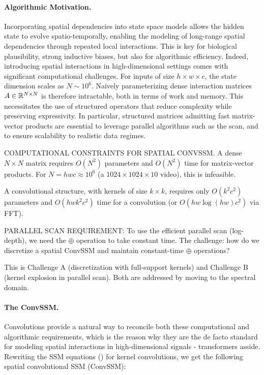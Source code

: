 \documentclass{article}
\begin{document}
\paragraph{Algorithmic Motivation.} 
Incorporating spatial dependencies into state space models allows the hidden state to evolve spatio-temporally, enabling the modeling of long-range spatial dependencies through repeated local interactions. This is key for biological plausibility, strong inductive biases, but also for algorithmic efficiency.
%
Indeed, introducing spatial interactions in high-dimensional settings comes with significant computational challenges. For inputs of size $h \!\times\! w \!\times\! c$, the state dimension scales as $N \sim 10^6$. Naively parameterizing dense interaction matrices $A \in \mathbb{R}^{N \times N}$ is therefore intractable, both in terms of work and memory.
%
This necessitates the use of structured operators that reduce complexity while preserving expressivity. In particular, structured matrices admitting fast matrix-vector products are essential to leverage parallel algorithms such as the scan, and to ensure scalability to realistic data regimes.

\begin{thomasbox}
COMPUTATIONAL CONSTRAINTS FOR SPATIAL CONVSSM. A dense $N \times N$ matrix requires $O(N^2)$ parameters and $O(N^2)$ time for matrix-vector products. For $N = hwc \approx 10^6$ (a $1024 \times 1024 \times 10$ video), this is infeasible.

A convolutional structure, with kernels of size $k \times k$, requires only $O(k^2 c^2)$ parameters and $O(hwk^2 c^2)$ time for a convolution (or $O(hw \log(hw) c^2)$ via FFT).

PARALLEL SCAN REQUIREMENT: To use the efficient parallel scan (log-depth), we need the $\oplus$ operation to take constant time. The challenge: how do we discretize a spatial ConvSSM and maintain constant-time $\oplus$ operations?

This is Challenge A (discretization with full-support kernels) and Challenge B (kernel explosion in parallel scan). Both are addressed by moving to the spectral domain.
\end{thomasbox}

\paragraph{The ConvSSM.}
Convolutions provide a natural way to reconcile both these computational and algorithmic requirements, which is the reason why they are the de facto standard for modeling spatial interactions in high-dimensional signals - transformers asside. Rewriting the SSM equations () for kernel convolutions, we get the following spatial convolutional SSM (ConvSSM):
\end{document}
